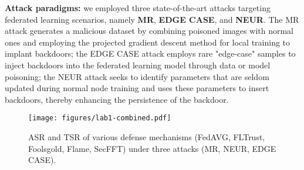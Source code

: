 \documentclass[lettersize,journal]{IEEEtran}
\begin{document}
\textbf{Attack paradigms:} we employed three state-of-the-art attacks targeting federated learning scenarios, namely \textbf{MR}\cite{MR}, \textbf{EDGE CASE}\cite{EDGE_CASE}, and \textbf{NEUR}\cite{zhang2022neurotoxin}. The MR attack generates a malicious dataset by combining poisoned images with normal ones and employing the projected gradient descent method for local training to implant backdoors; the EDGE CASE attack employs rare "edge-case" samples to inject backdoors into the federated learning model through data or model poisoning; the NEUR attack seeks to identify parameters that are seldom updated during normal node training and uses these parameters to insert backdoors, thereby enhancing the persistence of the backdoor.

\begin{figure*}[!ht]
    \centering
    \texttt{[image: figures/lab1-combined.pdf]}
    \caption{ASR and TSR of various defense mechanisms (FedAVG, FLTrust, Foolsgold, Flame, SecFFT) under three attacks (MR, NEUR, EDGE CASE).}
    \label{fig:lab1}
\end{figure*}
\end{document}
